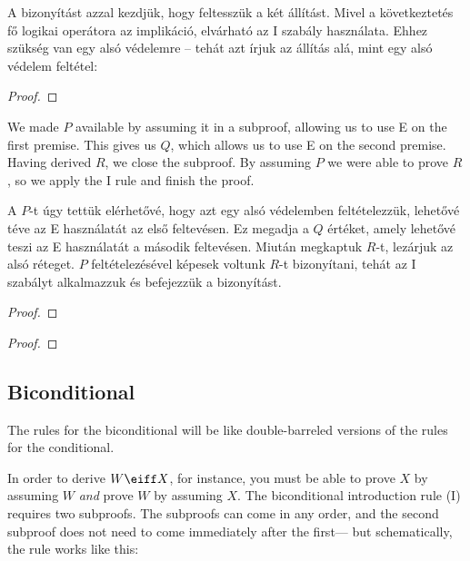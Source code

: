 A bizonyítást azzal kezdjük, hogy feltesszük a két állítást. Mivel a következtetés fő logikai operátora az implikáció, elvárható az {\eif}I szabály használata. Ehhez szükség van egy alsó védelemre -- tehát azt írjuk az állítás alá, mint egy alsó védelem feltétel:

\begin{proof}
	\open
	\close
\end{proof}

We made $P$ available by assuming it in a subproof, allowing us to use {\eif}E on the first premise. This gives us $Q$, which allows us to use {\eif}E on the second premise. Having derived  $R$, we close the subproof. By assuming $P$ we were able to prove $R$, so we apply the {\eif}I rule and finish the proof.

A $P$-t úgy tettük elérhetővé, hogy azt egy alsó védelemben feltételezzük, lehetővé téve az {\eif}E használatát az első feltevésen. Ez megadja a $Q$ értéket, amely lehetővé teszi az {\eif}E használatát a második feltevésen. Miután megkaptuk $R$-t, lezárjuk az alsó réteget. $P$ feltételezésével képesek voltunk $R$-t bizonyítani, tehát az {\eif}I szabályt alkalmazzuk és befejezzük a bizonyítást.

\label{HSproof}
\begin{proof}
	\open
	\close
\end{proof}

\label{HSproof}
\begin{proof}
	\open
	\close
\end{proof}



\subsection{Biconditional}
The rules for the biconditional will be like double-barreled versions of the rules for the conditional.

In order to derive $W \eiff X$, for instance, you must be able to prove $X$ by assuming $W$ \emph{and} prove $W$ by assuming $X$. The biconditional introduction rule ({\eiff}I) requires two subproofs. The subproofs can come in any order, and the second subproof does not need to come immediately after the first--- but schematically, the rule works like this:

